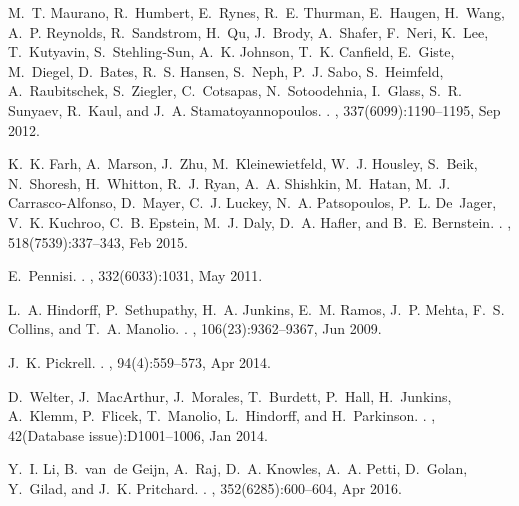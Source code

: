 \documentclass[
]{article}
\begin{document}
\begin{thebibliography}{100}

M.~T. Maurano, R.~Humbert, E.~Rynes, R.~E. Thurman, E.~Haugen, H.~Wang, A.~P.
  Reynolds, R.~Sandstrom, H.~Qu, J.~Brody, A.~Shafer, F.~Neri, K.~Lee,
  T.~Kutyavin, S.~Stehling-Sun, A.~K. Johnson, T.~K. Canfield, E.~Giste,
  M.~Diegel, D.~Bates, R.~S. Hansen, S.~Neph, P.~J. Sabo, S.~Heimfeld,
  A.~Raubitschek, S.~Ziegler, C.~Cotsapas, N.~Sotoodehnia, I.~Glass, S.~R.
  Sunyaev, R.~Kaul, and J.~A. Stamatoyannopoulos.
.
, 337(6099):1190--1195, Sep 2012.

K.~K. Farh, A.~Marson, J.~Zhu, M.~Kleinewietfeld, W.~J. Housley, S.~Beik,
  N.~Shoresh, H.~Whitton, R.~J. Ryan, A.~A. Shishkin, M.~Hatan, M.~J.
  Carrasco-Alfonso, D.~Mayer, C.~J. Luckey, N.~A. Patsopoulos, P.~L. De~Jager,
  V.~K. Kuchroo, C.~B. Epstein, M.~J. Daly, D.~A. Hafler, and B.~E. Bernstein.
.
, 518(7539):337--343, Feb 2015.

E.~Pennisi.
.
, 332(6033):1031, May 2011.

L.~A. Hindorff, P.~Sethupathy, H.~A. Junkins, E.~M. Ramos, J.~P. Mehta, F.~S.
  Collins, and T.~A. Manolio.
.
, 106(23):9362--9367, Jun 2009.

J.~K. Pickrell.
.
, 94(4):559--573, Apr 2014.

D.~Welter, J.~MacArthur, J.~Morales, T.~Burdett, P.~Hall, H.~Junkins, A.~Klemm,
  P.~Flicek, T.~Manolio, L.~Hindorff, and H.~Parkinson.
.
, 42(Database issue):D1001--1006, Jan 2014.

Y.~I. Li, B.~van~de Geijn, A.~Raj, D.~A. Knowles, A.~A. Petti, D.~Golan,
  Y.~Gilad, and J.~K. Pritchard.
.
, 352(6285):600--604, Apr 2016.


\end{thebibliography}
\end{document}
